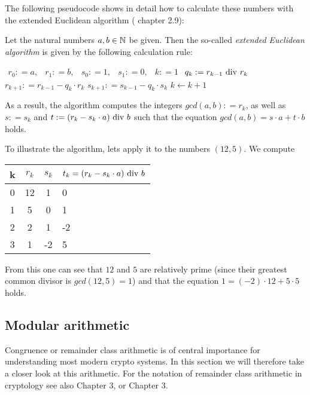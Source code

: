The following pseudocode shows in detail how to calculate these numbers with the extended Euclidean algorithm (\cite{JB} chapter 2.9):
\begin{definition} 
\label{theorem: ext_Euclid}
Let the natural numbers $ a, b \in \mathbb{N} $ be given. Then the so-called \textit{extended Euclidean algorithm} is given by the following calculation rule:
\begin{algorithmic}
\State $ \begin{array}{ccccc}
r_0: = a, & r_1: = b, & s_0: = 1, & s_1: = 0, & k: = 1
\end{array} $
\State $ q_k: = r_{k-1} \text{ div } r_k $
\State $ r_{k + 1}: = r_{k-1} -q_k \cdot r_k $
\State $ s_{k + 1}: = s_{k-1} -q_k \cdot s_k $
\State $ k \gets k + 1 $
\EndWhile
\end{algorithmic}
As a result, the algorithm computes the integers $ gcd (a, b): = r_k $, as well as $ s: = s_k $ and $ t: = (r_k-s_k \cdot a) \text{ div } b $ such that the equation
$ gcd (a, b) = s \cdot a + t \cdot b $ holds.
\end{definition}
\begin{example} To illustrate the algorithm, lets apply it to the numbers $ (12,5) $. We compute
\begin{center}
  \begin{tabular}{c | c c l}
    k & $ r_k $ & $ s_k $ & $ t_k = (r_k-s_k \cdot a) \text{ div } b $ \\\hline
    0 & 12 & 1 & 0 \\
    1 & 5 & 0 & 1 \\
    2 & 2 & 1 & -2 \\
    3 & 1 & -2 & 5 \\
  \end{tabular}
\end{center}
From this one can see that $ 12 $ and $ 5 $ are relatively prime (since their greatest common divisor is $ gcd (12, 5) = 1 $) and that the equation $ 1 = (-2) \cdot 12 + 5 \cdot 5 $ holds.
\end{example}

\subsection{Modular arithmetic}
Congruence or remainder class arithmetic is of central importance for understanding most modern crypto systems. In this section we will therefore take a closer look at this arithmetic. For the notation of remainder class arithmetic in cryptology see also \cite{JB} Chapter 3, or \cite{AL} Chapter 3.

